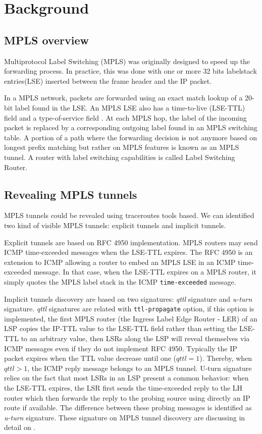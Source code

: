 \section{Background}

\subsection{MPLS overview}

Multiprotocol Label Switching (MPLS) \cite{Vanaubel15} was originally designed to speed up the forwarding process. In practice, this was done with one or more 32 bits labelstack entries(LSE) inserted between the frame header  and the IP packet. 

In a MPLS network, packets are forwarded using an exact match lookup of a 20-bit label found in the LSE. An MPLS LSE also has a time-to-live (LSE-TTL) field and a type-of-service field \cite{rfc1771}. At each MPLS hop, the label of the incoming packet is replaced by a corresponding outgoing label found in an MPLS switching table. A portion of a path where the forwarding decision is not anymore based on longest prefix matching but rather on MPLS features is known as an MPLS tunnel. A router with label switching capabilities is called Label Switching Router. 

\subsection{Revealing MPLS tunnels}

MPLS tunnels could be revealed using traceroutes tools based. We can identified two kind of visible MPLS tunnels: explicit tunnels and implicit tunnels.

Explicit tunnels are based on RFC 4950 implementation. MPLS routers may send ICMP time-exceeded messages when the LSE-TTL expires. The RFC 4950 is an extension to ICMP allowing a router to embed an MPLS LSE in an ICMP time-exceeded message. In that case, when the LSE-TTL expires on a MPLS router, it simply quotes the MPLS label stack in the ICMP \texttt{time-exceeded} message. 

Implicit tunnels discovery are based on two signatures: \textit{qttl} signature and\textit{ u-turn} signature. \textit{qttl} signatures are related with \texttt{ttl-propagate} option, if this option is implemented, the first MPLS router (the Ingress Label Edge Router - LER) of an LSP copies the IP-TTL value to the LSE-TTL field rather than setting the LSE-TTL to an arbitrary value, then LSRs along the LSP will reveal themselves via ICMP messages even if they do not implement RFC 4950. Typically the IP packet expires when the TTL value decrease until one ($qttl=1$). Thereby, when $qttl>1$, the ICMP reply message belongs to an MPLS tunnel. U-turn signature relies on the fact that most LSRs in an LSP present a common behavior: when the LSE-TTL expires, the LSR first sends the time-exceeded reply to the LH router which then forwards the reply to the probing source using directly an IP route if available. The difference between these probing messages is identified as \textit{u-turn} signature. These signature on MPLS tunnel discovery are discussing in detail on\cite{Donnet12} . 

